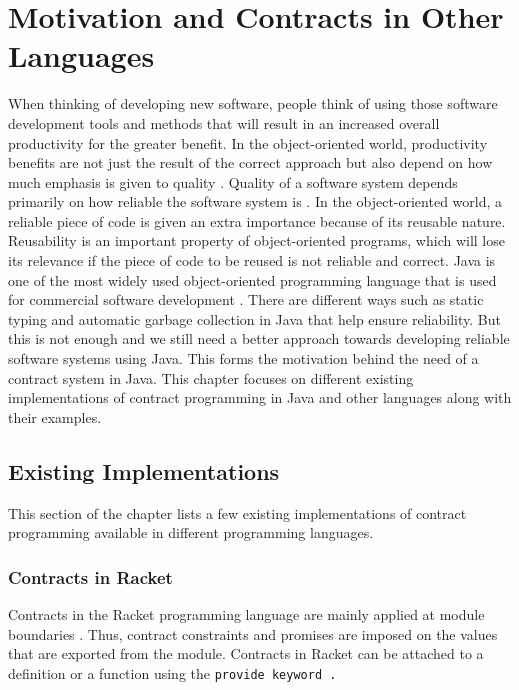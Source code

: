 \chapter{Motivation and Contracts in Other Languages}

When thinking of developing new software, people think of using those software development tools and methods that will result in an increased overall productivity for the greater benefit. In the object-oriented world, productivity benefits are not just the result of the correct approach but also depend on how much emphasis is given to quality \cite{meyer1998building}.
Quality of a software system depends primarily on how reliable the software system is \cite{meyer1998building}. 
In the object-oriented world, a reliable piece of code is given an extra importance because of its reusable nature. Reusability is an important property of object-oriented programs, which will lose its relevance if the piece of code to be reused is not reliable and correct. 
Java is one of the most widely used object-oriented programming language that is used for commercial software development \cite{WhyisJav37:online}. There are different ways such as static typing and automatic garbage collection in Java that help ensure reliability. But this is not enough and we still need a better approach towards developing reliable software systems using Java. This forms the motivation behind the need of a contract system in Java.
This chapter focuses on different existing implementations of contract programming in Java and other languages along with their examples.

\section{Existing Implementations}

This section of the chapter lists a few existing implementations of contract programming available in different programming languages. 


\subsection{Contracts in Racket}

Contracts in the Racket programming language are mainly applied at module boundaries \cite{RacketContracts}. Thus, contract constraints and promises are imposed on the values that are exported from the module. Contracts in Racket can be attached to a definition or a function using the \tt{provide} keyword \cite{RacketContracts}.

